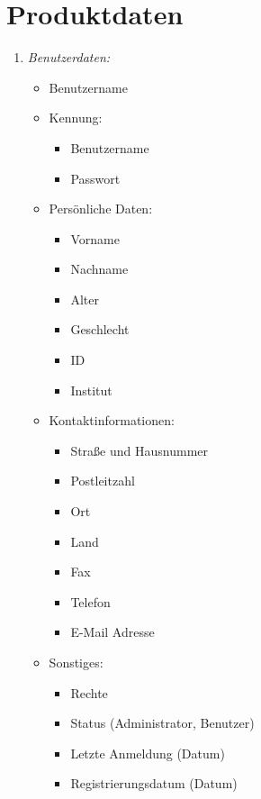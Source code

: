 \documentclass[parskip=full,11pt]{scrartcl}
\def\threedigits#1{%
  \ifnum#1<100 0\fi
  \ifnum#1<10 0\fi
  \number#1}
\begin{document}
\section{Produktdaten}
\begin{enumerate}[label={\textbf{/D\protect\threedigits{\theenumi}/}}, leftmargin=*]
\subsubsection{Personendaten}
\item \textit{Benutzerdaten:}
\begin{itemize}
   \item Benutzername
   
   \item Kennung:
   \begin{itemize}
     \item Benutzername
     \item Passwort
   \end{itemize}
 
   \item Persönliche Daten:
   \begin{itemize}
     \item Vorname
     \item Nachname
     \item Alter
     \item Geschlecht
     \item ID
     \item Institut 
   \end{itemize}
   
    \item Kontaktinformationen:
   \begin{itemize}
     \item Straße und Hausnummer
     \item Postleitzahl 
     \item Ort
     \item Land
     \item Fax
     \item Telefon
     \item E-Mail Adresse  
   \end{itemize}
   
    \item Sonstiges:
   \begin{itemize}
     \item Rechte
     \item Status (Administrator, Benutzer) 
     \item Letzte Anmeldung (Datum) 
     \item Registrierungsdatum (Datum)    
   \end{itemize}
 

\end{itemize}
\end{enumerate}
\end{document}
